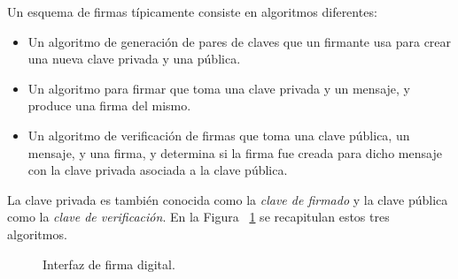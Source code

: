 Un esquema de firmas típicamente consiste en algoritmos diferentes:
\begin{itemize}
  \item Un algoritmo de generación de pares de claves que un firmante usa para crear una nueva clave privada y una pública.
  \item Un algoritmo para firmar que toma una clave privada y un mensaje, y produce una firma del mismo.
  \item Un algoritmo de verificación de firmas que toma una clave pública, un mensaje, y una firma, y determina si la firma
  fue creada para dicho mensaje con la clave privada asociada a la clave pública. 
\end{itemize}

La clave privada es también conocida como la \textit{clave de firmado} y la clave pública como la \textit{clave de verificación}.
En la Figura ~\ref{fig:digital-signatures} se recapitulan estos tres algoritmos.

\begin{figure}
  \centering
  \hspace{1.4em}
  \hspace{1.4em}
  \caption{Interfaz de firma digital.}
  \label{fig:digital-signatures}
\end{figure}


